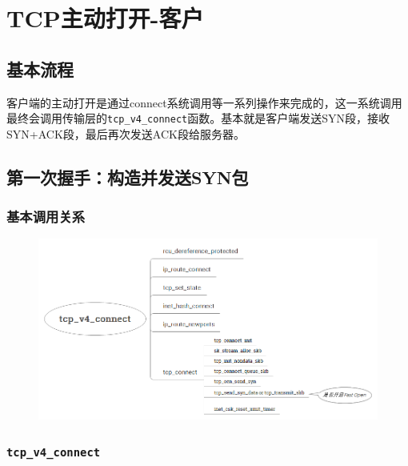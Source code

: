 \section{TCP主动打开-客户}
\label{sec:tcp_connect_client}

    \subsection{基本流程}
    \label{subsec:tcp_connect_flow}
        客户端的主动打开是通过connect系统调用等一系列操作来完成的，这一系统调用最终会调用传输层的\texttt{tcp_v4_connect}函数。基本就是客户端发送SYN段，接收SYN+ACK段，最后再次发送ACK段给服务器。

    \subsection{第一次握手：构造并发送SYN包}
    \label{subsec:tcp_connect_syn}

        \subsubsection{基本调用关系}

                \begin{figure}[htb]        
                    \centering
                    \includegraphics[width=\textwidth]  {images/Client:Send SYN.png}
                \end{figure}            
        \subsubsection{\texttt{tcp_v4_connect}}
        \label{subsubsec:tcp_v4_connect}

